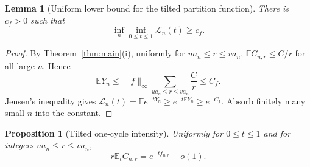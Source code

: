 \documentclass[11pt]{article}
\newcommand{\E}{\mathbb E}
\newcommand{\1}{\mathbf 1}
\newcommand{\cL}{\mathcal L}
\newtheorem{proposition}[theorem]{Proposition}
\newtheorem{lemma}[theorem]{Lemma}
\theoremstyle{definition}
\theoremstyle{remark}
\begin{document}
\begin{lemma}[Uniform lower bound for the tilted partition function]
\label{lem:partition-lower}
There is $c_f>0$ such that
\begin{equation}\label{eq:partition-lower}
  \inf_n\inf_{0\leq t\leq1}\cL_n(t)\geq c_f.
\end{equation}
\end{lemma}

\begin{proof}
By Theorem~\ref{thm:main}(i), uniformly for
$ua_n\leq r\leq va_n$,
$\E C_{n,r}\leq C/r$ for all large $n$.  Hence
\[
  \E Y_n
  \leq \|f\|_\infty
       \sum_{ua_n\leq r\leq va_n}\frac Cr
  \leq C_f.
\]
Jensen's inequality gives
$\cL_n(t)=\E e^{-tY_n}\geq e^{-t\E Y_n}\geq e^{-C_f}$.
Absorb finitely many small $n$ into the constant.
\end{proof}

\begin{proposition}[Tilted one-cycle intensity]
\label{prop:tilted-intensity}
Uniformly for $0\leq t\leq1$ and for integers
$ua_n\leq r\leq va_n$,
\begin{equation}\label{eq:tilted-intensity}
  r\E_t C_{n,r}=e^{-tf_{n,r}}+o(1).
\end{equation}
\end{proposition}
\end{document}
